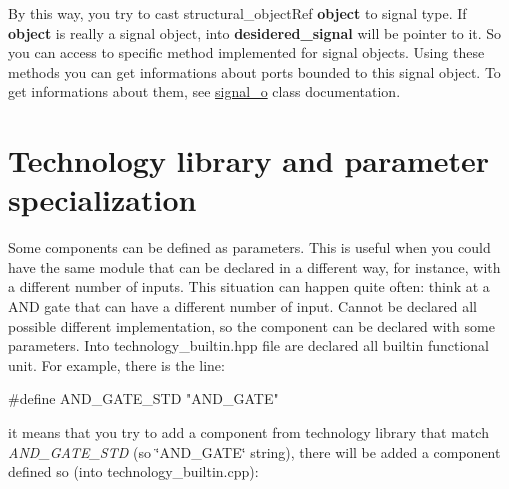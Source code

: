  By this way, you try to cast structural\+\_\+object\+Ref {\bfseries object} to signal type. If {\bfseries object} is really a signal object, into {\bfseries desidered\+\_\+signal} will be pointer to it. So you can access to specific method implemented for signal objects. Using these methods you can get informations about ports bounded to this signal object. To get informations about them, see \hyperlink{classsignal__o}{signal\+\_\+o} class documentation.\hypertarget{src_circuit_page_circuit_parameters}{}\section{Technology library and parameter specialization}\label{src_circuit_page_circuit_parameters}
Some components can be defined as parameters. This is useful when you could have the same module that can be declared in a different way, for instance, with a different number of inputs. This situation can happen quite often\+: think at a A\+ND gate that can have a different number of input. Cannot be declared all possible different implementation, so the component can be declared with some parameters. Into technology\+\_\+builtin.\+hpp file are declared all builtin functional unit. For example, there is the line\+: 
\begin{DoxyCode}
\textcolor{preprocessor}{#define AND\_GATE\_STD       "AND\_GATE"}
\end{DoxyCode}
 it means that you try to add a component from technology library that match {\itshape A\+N\+D\+\_\+\+G\+A\+T\+E\+\_\+\+S\+TD} (so \char`\"{}\+A\+N\+D\+\_\+\+G\+A\+T\+E\char`\"{} string), there will be added a component defined so (into technology\+\_\+builtin.\+cpp)\+: 
